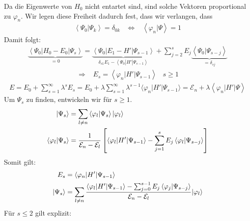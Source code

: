 Da die Eigenwerte von $H_0$ nicht entartet sind, sind solche Vektoren proportional
zu $\varphi_n$. Wir legen diese Freiheit dadurch fest, dass wir verlangen, dass
\begin{align*}
    \left\langle \Psi_0 | \Psi_k \right\rangle = \delta_{0k}
    \hspace{10pt} \Leftrightarrow \hspace{10pt}
    \left\langle \varphi_n | \Psi \right\rangle = 1
\end{align*}
Damit folgt:
\begin{align*}
    \underbrace{\left\langle \Psi_0 | H_0 - E_0 | \Psi_s \right\rangle}_{=0}
    = \underbrace{\left\langle \Psi_0 | E_1 - H' | \Psi_{s-1} \right\rangle}_{\delta_{s1} E_1 - \left\langle \Psi_0 | H' | \Psi_{s-1} \right\rangle}
    + \sum_{j=2}^s E_j \underbrace{\left\langle \Psi_0 | \Psi_{s-j} \right\rangle}_{= \delta_{sj}}
\end{align*}
\begin{align*}
    \Rightarrow \hspace{10pt}
    E_s = \left\langle \varphi_n | H' | \Psi_{s-1} \right\rangle
    \hspace{10pt} s \geq 1
\end{align*}
\begin{align*}
    E = E_0 + \sum_{s=1}^\infty \lambda^s E_s
    = E_0 + \lambda \sum_{s=1}^\infty \lambda^{s-1} \langle \varphi_n | H' | \Psi_{s-1} \rangle
    = \mathcal{E}_n + \lambda \left\langle \varphi_n | H' | \Psi \right\rangle
\end{align*}
Um $\Psi_s$ zu finden, entwickeln wir für $s \geq 1$.
\begin{align*}
    |\Psi_s\rangle &= \sum_{l \neq n} \left\langle \varphi_l | \Psi_s \right\rangle |\varphi_l\rangle
    \\
    \left\langle \varphi_l | \Psi_s \right\rangle &=
    \frac{1}{\mathcal{E}_n - \mathcal{E}_l} \left[ \left\langle \varphi_l | H' | \Psi_{s-1} \right\rangle
        - \sum_{j=1}^s E_j \left\langle \varphi_l | \Psi_{s-j} \right\rangle \right]
\end{align*}
Somit gilt:
\begin{align*}
    E_s &= \left\langle \varphi_n | H' | \Psi_{s-1} \right\rangle
    \\
    | \Psi_s \rangle &= \sum_{l \neq n} \frac{\left\langle \varphi_l | H' | \Psi_{s-1} \right\rangle - \sum_{j=0}^{s-1} E_j \left\langle \varphi_j | \Psi_{s-j} \right\rangle}{\mathcal{E}_n - \mathcal{E}_l} |\varphi_l \rangle
\end{align*}
Für $s \leq 2$ gilt explizit:
